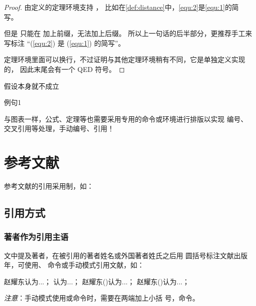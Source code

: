 \begin{proof}
由定义的定理环境支持 ，
比如在\autoref{def:distance}中，\autoref{equ:2}是\autoref{equ:1}的简写。

但是  只能在  加上前缀，无法加上后缀。
所以上一句话的后半部分，更推荐手工来写标注 “(\ref{equ:2}) 是 (\ref{equ:1}) 的简写”。

定理环境里面可以换行，不过证明与其他定理环境稍有不同，它是单独定义实现的，
因此末尾会有一个 QED 符号。
\end{proof}

\begin{assumption}
\label{assume:fail}
假设本身就不成立
\end{assumption}

\begin{lines}
\label{s1}
例句1
\end{lines}

与图表一样，公式、定理等也需要采用专用的命令或环境进行排版以实现
编号、交叉引用等处理，手动编号、引用！

\section{参考文献}
\label{sec:bib}
参考文献的引用采用制，如：

\subsection{引用方式}
\subsubsection{著者作为引用主语}

文中提及著者，在被引用的著者姓名或外国著者姓氏之后用
圆括号标注文献出版年，可使用、
命令或手动模式引用文献，如：

\begin{center}
  \begin{minipage}[h]{0.9\linewidth}
赵耀东认为...；
\textcite{赵耀东1998--}认为...；
赵耀东(\cite*{赵耀东1998--})认为...；
赵耀东(\citeyear{赵耀东1998--})认为...；
  \end{minipage}
\end{center}

\emph{注意}：手动模式使用或命令时，需要在两端加上小括
  号，命令。

